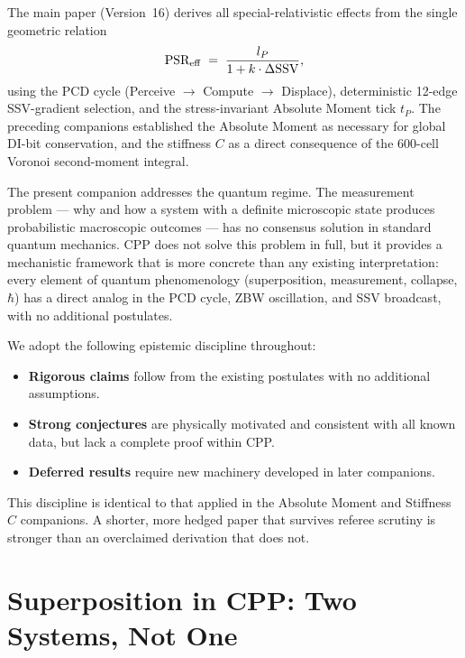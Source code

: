 \documentclass[12pt]{article}
\newcommand{\lP}{l_P}
\newcommand{\tP}{t_P}
\newcommand{\SSV}{\text{SSV}}
\newcommand{\PSR}{\text{PSR}}
\begin{document}
The main paper (Version~16) derives all special-relativistic effects from the
single geometric relation
\begin{equation}
  \PSR_{\rm eff} \;=\; \frac{\lP}{1 + k\cdot\Delta\SSV},
  \label{eq:PSR}
\end{equation}
using the PCD cycle (Perceive $\to$ Compute $\to$ Displace), deterministic
12-edge SSV-gradient selection, and the stress-invariant Absolute Moment
tick $\tP$.  The preceding companions established the Absolute Moment as
necessary for global DI-bit conservation, and the stiffness $C$ as a direct
consequence of the 600-cell Voronoi second-moment integral.

The present companion addresses the quantum regime.  The measurement problem
--- why and how a system with a definite microscopic state produces
probabilistic macroscopic outcomes --- has no consensus solution in standard
quantum mechanics.  CPP does not solve this problem in full, but it provides
a mechanistic framework that is more concrete than any existing interpretation:
every element of quantum phenomenology (superposition, measurement, collapse,
$\hbar$) has a direct analog in the PCD cycle, ZBW oscillation, and SSV
broadcast, with no additional postulates.

We adopt the following epistemic discipline throughout:
\begin{itemize}[noitemsep]
  \item \textbf{Rigorous claims} follow from the existing postulates with no
    additional assumptions.
  \item \textbf{Strong conjectures} are physically motivated and consistent
    with all known data, but lack a complete proof within CPP.
  \item \textbf{Deferred results} require new machinery developed in later
    companions.
\end{itemize}
This discipline is identical to that applied in the Absolute Moment and
Stiffness~$C$ companions.  A shorter, more hedged paper that survives referee
scrutiny is stronger than an overclaimed derivation that does not.

\section{Superposition in CPP: Two Systems, Not One}
\label{sec:superposition}
\end{document}
